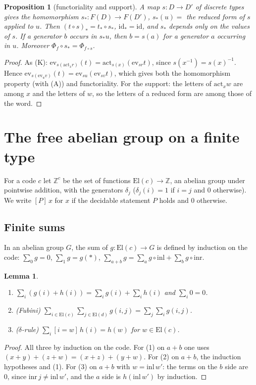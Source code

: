 \documentclass[11pt]{amsart}
\newtheorem{proposition}[theorem]{Proposition}
\newtheorem{lemma}[theorem]{Lemma}
\theoremstyle{definition}
\theoremstyle{remark}
\newcommand{\El}{\mathrm{El}}
\newcommand{\Z}{\mathbb{Z}}
\newcommand{\act}{\mathrm{act}}
\newcommand{\ev}{\mathrm{ev}}
\begin{document}
\begin{proposition}[functoriality and support]\label{prop:push-words}
A map $s:D\to D'$ of discrete types gives the homomorphism
$s_*:F(D)\to F(D')$, $s_*(u)=$ the reduced form of $s$ applied to $u$.
Then $(t\circ s)_*=t_*\circ s_*$, $\mathrm{id}_*=\mathrm{id}$, and
$s_*$ depends only on the values of $s$. If a generator $b$ occurs in
$s_*u$, then $b=s(a)$ for a generator $a$ occurring in $u$. Moreover
$\Phi_f\circ s_*=\Phi_{f\circ s}$.
\end{proposition}
\begin{proof}
As (K): $\ev_{s(\act_x r)}(t)=\act_{s(x)}(\ev_{s r}t)$, since
$s(x^{-1})=s(x)^{-1}$. Hence $\ev_{s(\ev_u v)}(t)=\ev_{su}(\ev_{sv}t)$,
which gives both the homomorphism property (with (A)) and functoriality.
For the support: the letters of $\act_x w$ are among $x$ and the letters
of $w$, so the letters of a reduced form are among those of the word.
\end{proof}

\section{The free abelian group on a finite type}\label{sec:ab}

For a code $c$ let $\Z^c$ be the set of functions $\El(c)\to\Z$, an
abelian group under pointwise addition, with the generators $\delta_j$
($\delta_j(i)=1$ if $i=j$ and $0$ otherwise). We write $[P]\,x$ for $x$ if
the decidable statement $P$ holds and $0$ otherwise.

\subsection*{Finite sums} In an abelian group $G$, the sum of
$g:\El(c)\to G$ is defined by induction on the code:
$\sum_{0}g=0$, $\sum_{1}g=g(*)$,
$\sum_{a+b}g=\sum_a g\circ\mathrm{inl}+\sum_b g\circ\mathrm{inr}$.

\begin{lemma}\label{lem:sums}
\begin{enumerate}
\item $\sum_i (g(i)+h(i))=\sum_i g(i)+\sum_i h(i)$ and $\sum_i 0=0$.
\item (Fubini) $\sum_{i\in\El(c)}\sum_{j\in\El(d)}g(i,j)=\sum_{j}\sum_{i}g(i,j)$.
\item ($\delta$-rule) $\sum_i [i=w]\,h(i)=h(w)$ for $w\in\El(c)$.
\end{enumerate}
\end{lemma}
\begin{proof}
All three by induction on the code. For (1) on $a+b$ one uses
$(x+y)+(z+w)=(x+z)+(y+w)$. For (2) on $a+b$, the induction hypotheses and
(1). For (3) on $a+b$ with $w=\mathrm{inl}\,w'$: the terms on the $b$ side
are $0$, since $\mathrm{inr}\,j\ne\mathrm{inl}\,w'$, and the $a$ side is
$h(\mathrm{inl}\,w')$ by induction.
\end{proof}
\end{document}
